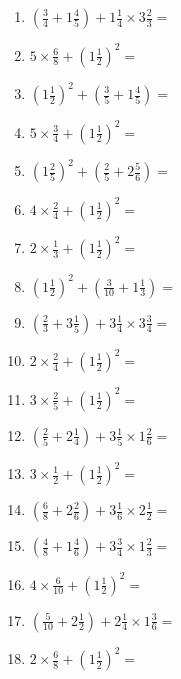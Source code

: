 \documentclass[12pt]{article}
\begin{document}
\begin{enumerate}
\item \large $ (\frac{3}{4} + 1 \frac{4}{5}) + 1 \frac{1}{4} \times 3 \frac{2}{3} = $ \vspace{1.8cm}
\item \large $ 5 \times \frac{6}{8} + (1 \frac{1}{2})^2 = $ \vspace{1.8cm}
\item \large $ (1 \frac{1}{2})^2 + (\frac{3}{5} + 1 \frac{4}{5}) = $ \vspace{1.8cm}
\item \large $ 5 \times \frac{3}{4} + (1 \frac{1}{2})^2 = $ \vspace{1.8cm}
\item \large $ (1 \frac{2}{5})^2 + (\frac{2}{5} + 2 \frac{5}{6}) = $ \vspace{1.8cm}
\item \large $ 4 \times \frac{2}{4} + (1 \frac{1}{2})^2 = $ \vspace{1.8cm}
\item \large $ 2 \times \frac{1}{3} + (1 \frac{1}{2})^2 = $ \vspace{1.8cm}
\item \large $ (1 \frac{1}{2})^2 + (\frac{3}{10} + 1 \frac{1}{3}) = $ \vspace{1.8cm}
\newpage
\item \large $ (\frac{2}{3} + 3 \frac{1}{5}) + 3 \frac{1}{4} \times 3 \frac{3}{4} = $ \vspace{1.8cm}
\item \large $ 2 \times \frac{2}{4} + (1 \frac{1}{2})^2 = $ \vspace{1.8cm}
\item \large $ 3 \times \frac{2}{5} + (1 \frac{1}{2})^2 = $ \vspace{1.8cm}
\item \large $ (\frac{2}{5} + 2 \frac{1}{4}) + 3 \frac{1}{5} \times 1 \frac{2}{6} = $ \vspace{1.8cm}
\item \large $ 3 \times \frac{1}{2} + (1 \frac{1}{2})^2 = $ \vspace{1.8cm}
\item \large $ (\frac{6}{8} + 2 \frac{2}{6}) + 3 \frac{1}{6} \times 2 \frac{1}{2} = $ \vspace{1.8cm}
\item \large $ (\frac{4}{8} + 1 \frac{4}{6}) + 3 \frac{3}{4} \times 1 \frac{2}{3} = $ \vspace{1.8cm}
\item \large $ 4 \times \frac{6}{10} + (1 \frac{1}{2})^2 = $ \vspace{1.8cm}
\item \large $ (\frac{5}{10} + 2 \frac{1}{2}) + 2 \frac{1}{4} \times 1 \frac{3}{6} = $ \vspace{1.8cm}
\item \large $ 2 \times \frac{6}{8} + (1 \frac{1}{2})^2 = $ \vspace{1.8cm}
\end{enumerate}\newpage
\end{document}
